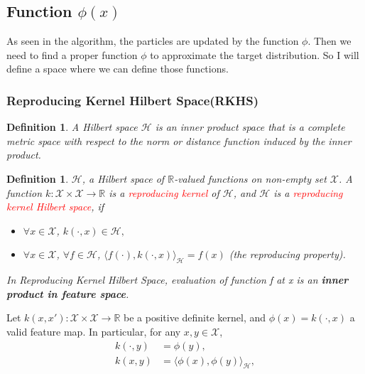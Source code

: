 \documentclass{article}
\newtheorem{definition}[theorem]{Definition} %
\begin{document}
\subsection{Function $\phi(x)$}
As seen in the algorithm, the particles are updated by the function $\phi$. Then we need to find a proper function $\phi$ to approximate the target distribution. So I will define a space where we can define those functions.

\subsubsection{Reproducing Kernel Hilbert Space(RKHS)}
\begin{tcolorbox}
\begin{definition}
    A Hilbert space $\mathcal{H}$ is an inner product space that is a complete metric space with respect to the norm or distance function induced by the inner product.
\end{definition}    
\end{tcolorbox}


\begin{tcolorbox}
\begin{definition}
    $\mathcal{H}$, a Hilbert space of $\mathbb{R}$-valued functions on non-empty set $\mathcal{X}$. A function $k : \mathcal{X} \times \mathcal{X} \rightarrow \mathbb{R}$ is a \textcolor{red}{reproducing kernel} of $\mathcal{H}$, and $\mathcal{H}$ is a \textcolor{red}{reproducing kernel Hilbert space}, if
    \begin{itemize}
        \item $\forall x \in \mathcal{X}$, $k(\cdot, x) \in \mathcal{H},$
        \item $\forall x \in \mathcal{X}$, $\forall f \in \mathcal{H}$, $\langle f(\cdot), k(\cdot, x) \rangle_{\mathcal{H}} = f(x)$ (the reproducing property).
    \end{itemize}
    In Reproducing Kernel Hilbert Space, evaluation of function f at x is an \textbf{inner product in feature space}.
\end{definition}
\end{tcolorbox}


Let $k(x, x') : \mathcal{X} \times \mathcal{X} \rightarrow \mathbb{R}$ be a positive definite kernel, and $\phi(x) = k(\cdot, x)$ a valid feature map. In particular, for any $x, y \in \mathcal{X}$,
\begin{align*}
    k(\cdot, y) &= \phi(y), \\
    k(x, y) &= \langle \phi(x), \phi(y) \rangle_{\mathcal{H}},
\end{align*}
\end{document}
